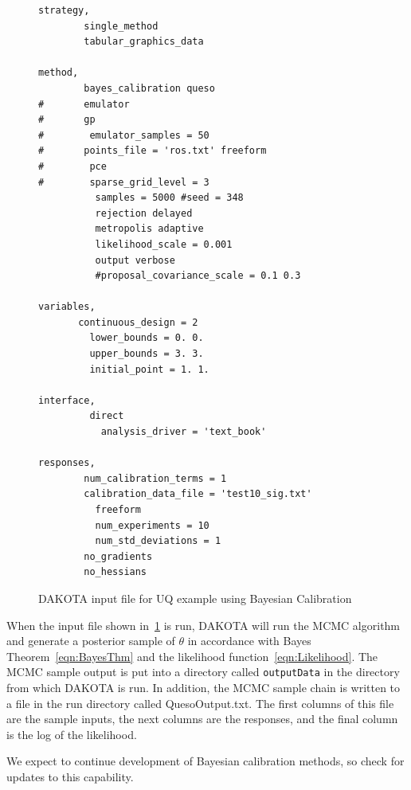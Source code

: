 \begin{figure}
\centering
\begin{bigbox}
\begin{small}
\begin{verbatim}
strategy,
        single_method
        tabular_graphics_data

method,
        bayes_calibration queso
#       emulator
#       gp
#        emulator_samples = 50
#       points_file = 'ros.txt' freeform
#        pce 
#        sparse_grid_level = 3 
          samples = 5000 #seed = 348                                    
          rejection delayed
          metropolis adaptive
          likelihood_scale = 0.001
          output verbose
          #proposal_covariance_scale = 0.1 0.3
 
variables,
       continuous_design = 2
         lower_bounds = 0. 0.
         upper_bounds = 3. 3.
         initial_point = 1. 1.

interface,
         direct 
           analysis_driver = 'text_book'

responses,
        num_calibration_terms = 1
        calibration_data_file = 'test10_sig.txt'
          freeform
          num_experiments = 10
          num_std_deviations = 1
        no_gradients
        no_hessians
\end{verbatim}
\end{small}
\end{bigbox}
\caption{DAKOTA input file for UQ example using Bayesian Calibration}
\label{uq:figure18}
\end{figure}

When the input file shown in~\ref{uq:figure18} is run, 
DAKOTA will run the MCMC algorithm and generate a posterior sample of 
$\theta$ in accordance with Bayes Theorem~\ref{eqn:BayesThm} and 
the likelihood function~\ref{eqn:Likelihood}. The MCMC sample output 
is put into a directory called \texttt{outputData} in the directory 
from which DAKOTA is run.  In addition, the MCMC sample chain is 
written to a file in the run directory called QuesoOutput.txt. 
The first columns of this file are the sample inputs, the next columns 
are the responses, and the final column is the  log of the 
likelihood.

We expect to continue development of Bayesian calibration methods, 
so check for updates to this capability.  

